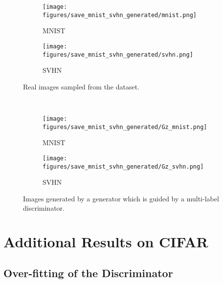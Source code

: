\documentclass[paper_2425.tex]{subfiles}
\begin{document}
\begin{figure}[tbp]
  \centering
  \begin{minipage}[t]{\linewidth}
    \begin{subfigure}{0.49\linewidth}
      \centering
\texttt{[image: figures/save\_mnist\_svhn\_generated/mnist.png]}
\caption{MNIST}
\end{subfigure}
    \begin{subfigure}{0.49\linewidth}
      \centering
\texttt{[image: figures/save\_mnist\_svhn\_generated/svhn.png]}
\caption{SVHN}
\end{subfigure}
    \vspace{-0.3cm}
    \caption{Real images sampled from the dataset.}
    \vspace{0.5cm}
    \label{apx:fig:mnist_svhn}
  \end{minipage}\\
  \begin{minipage}[t]{\linewidth}
    \begin{subfigure}{0.49\linewidth}
      \centering
\texttt{[image: figures/save\_mnist\_svhn\_generated/Gz\_mnist.png]}
\caption{MNIST}
\end{subfigure}
    \begin{subfigure}{0.49\linewidth}
      \centering
\texttt{[image: figures/save\_mnist\_svhn\_generated/Gz\_svhn.png]}
\caption{SVHN}
\end{subfigure}
    \vspace{-0.3cm}
    \caption{Images generated by a generator which is guided by a multi-label discriminator.}
    \vspace{0.5cm}
    \label{apx:fig:generated_mnist_svhn}
  \end{minipage}
\end{figure}





\section{Additional Results on CIFAR}
\label{apx:sec:results_cifar}

\subsection{Over-fitting of the Discriminator}
\end{document}
